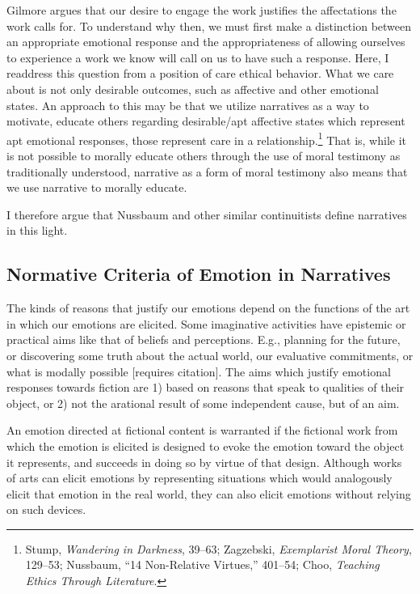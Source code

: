 \documentclass[
  12pt,
]{book}
\theoremstyle{definition}
\theoremstyle{definition}
\theoremstyle{definition}
\theoremstyle{definition}
\theoremstyle{remark}
\begin{document}
Gilmore argues that our desire to engage the work justifies the affectations the work calls for. To understand why then, we must first make a distinction between an appropriate emotional response and the appropriateness of allowing ourselves to experience a work we know will call on us to have such a response. Here, I readdress this question from a position of care ethical behavior. What we care about is not only desirable outcomes, such as affective and other emotional states. An approach to this may be that we utilize narratives as a way to motivate, educate others regarding desirable/apt affective states which represent apt emotional responses, those represent care in a relationship.\footnote{Stump, \emph{Wandering in {Darkness}}, 39--63; Zagzebski, \emph{Exemplarist {Moral Theory}}, 129--53; Nussbaum, {``14 {Non-Relative Virtues},''} 401--54; Choo, \emph{Teaching Ethics Through Literature}.} That is, while it is not possible to morally educate others through the use of moral testimony as traditionally understood, narrative as a form of moral testimony also means that we use narrative to morally educate.

I therefore argue that Nussbaum and other similar continuitists define narratives in this light.

\subsection*{Normative Criteria of Emotion in Narratives}\label{normative-criteria-of-emotion-in-narratives}

The kinds of reasons that justify our emotions depend on the functions of the art in which our emotions are elicited. Some imaginative activities have epistemic or practical aims like that of beliefs and perceptions. E.g., planning for the future, or discovering some truth about the actual world, our evaluative commitments, or what is modally possible {[}requires citation{]}. The aims which justify emotional responses towards fiction are 1) based on reasons that speak to qualities of their object, or 2) not the arational result of some independent cause, but of an aim.

An emotion directed at fictional content is warranted if the fictional work from which the emotion is elicited is designed to evoke the emotion toward the object it represents, and succeeds in doing so by virtue of that design. Although works of arts can elicit emotions by representing situations which would analogously elicit that emotion in the real world, they can also elicit emotions without relying on such devices.
\end{document}
